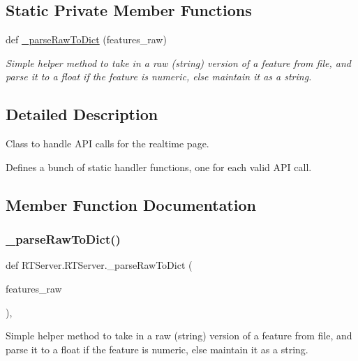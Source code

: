 \subsection*{Static Private Member Functions}
\begin{DoxyCompactItemize}
\item 
def \mbox{\hyperlink{class_r_t_server_1_1_r_t_server_a5f00435013297e6a4aeaa004dc7dabc7}{\+\_\+parse\+Raw\+To\+Dict}} (features\+\_\+raw)
\begin{DoxyCompactList}\small\item\em Simple helper method to take in a raw (string) version of a feature from file, and parse it to a float if the feature is numeric, else maintain it as a string. \end{DoxyCompactList}\end{DoxyCompactItemize}


\subsection{Detailed Description}
Class to handle A\+PI calls for the realtime page. 

Defines a bunch of static handler functions, one for each valid A\+PI call. 

\subsection{Member Function Documentation}
\mbox{\label{class_r_t_server_1_1_r_t_server_a5f00435013297e6a4aeaa004dc7dabc7}} 
\subsubsection{\texorpdfstring{\_parseRawToDict()}{\_parseRawToDict()}}
{\footnotesize\ttfamily def R\+T\+Server.\+R\+T\+Server.\+\_\+parse\+Raw\+To\+Dict (\begin{DoxyParamCaption}\item[{}]{features\+\_\+raw }\end{DoxyParamCaption})\hspace{0.3cm}{\ttfamily [static]}, {\ttfamily [private]}}



Simple helper method to take in a raw (string) version of a feature from file, and parse it to a float if the feature is numeric, else maintain it as a string. 



